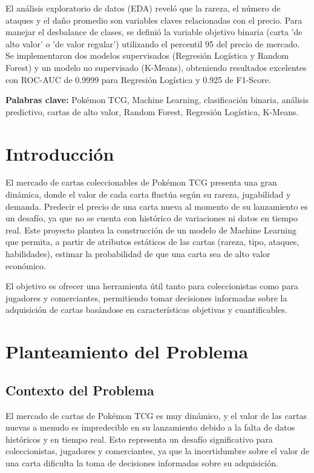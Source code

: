 \documentclass[12pt,letterpaper]{article}
\begin{document}
El análisis exploratorio de datos (EDA) reveló que la rareza, el número de ataques y el daño promedio son variables claves relacionadas con el precio. Para manejar el desbalance de clases, se definió la variable objetivo binaria (carta 'de alto valor' o 'de valor regular') utilizando el percentil 95 del precio de mercado. Se implementaron dos modelos supervisados (Regresión Logística y Random Forest) y un modelo no supervisado (K-Means), obteniendo resultados excelentes con ROC-AUC de 0.9999 para Regresión Logística y 0.925 de F1-Score.

\textbf{Palabras clave:} Pokémon TCG, Machine Learning, clasificación binaria, análisis predictivo, cartas de alto valor, Random Forest, Regresión Logística, K-Means.

\section{Introducción}

El mercado de cartas coleccionables de Pokémon TCG presenta una gran dinámica, donde el valor de cada carta fluctúa según su rareza, jugabilidad y demanda. Predecir el precio de una carta nueva al momento de su lanzamiento es un desafío, ya que no se cuenta con histórico de variaciones ni datos en tiempo real. Este proyecto plantea la construcción de un modelo de Machine Learning que permita, a partir de atributos estáticos de las cartas (rareza, tipo, ataques, habilidades), estimar la probabilidad de que una carta sea de alto valor económico.

El objetivo es ofrecer una herramienta útil tanto para coleccionistas como para jugadores y comerciantes, permitiendo tomar decisiones informadas sobre la adquisición de cartas basándose en características objetivas y cuantificables.

\section{Planteamiento del Problema}

\subsection{Contexto del Problema}

El mercado de cartas de Pokémon TCG es muy dinámico, y el valor de las cartas nuevas a menudo es impredecible en su lanzamiento debido a la falta de datos históricos y en tiempo real. Esto representa un desafío significativo para coleccionistas, jugadores y comerciantes, ya que la incertidumbre sobre el valor de una carta dificulta la toma de decisiones informadas sobre su adquisición.
\end{document}
